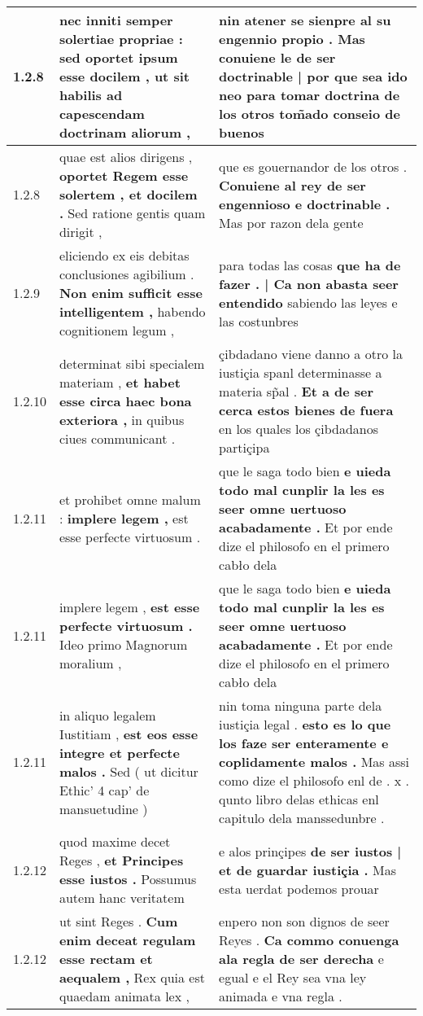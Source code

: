 \begin{tabular}{|p{1cm}|p{6.5cm}|p{6.5cm}|}
1.2.8 & nec inniti semper solertiae propriae : \textbf{ sed oportet ipsum esse docilem , } ut sit habilis ad capescendam doctrinam aliorum , & nin atener se sienpre al su engennio propio . \textbf{ Mas conuiene le de ser doctrinable | por que sea ido neo } para tomar doctrina de los otros tom̃ado conseio de buenos \\\hline
1.2.8 & quae est alios dirigens , \textbf{ oportet Regem esse solertem , et docilem . } Sed ratione gentis quam dirigit , & que es gouernandor de los otros . \textbf{ Conuiene al rey de ser engennioso e doctrinable . } Mas por razon dela gente \\\hline
1.2.9 & eliciendo ex eis debitas conclusiones agibilium . \textbf{ Non enim sufficit esse intelligentem , } habendo cognitionem legum , & para todas las cosas \textbf{ que ha de fazer . | Ca non abasta seer entendido } sabiendo las leyes e las costunbres \\\hline
1.2.10 & determinat sibi specialem materiam , \textbf{ et habet esse circa haec bona exteriora , } in quibus ciues communicant . & çibdadano viene danno a otro la iustiçia spanl determinasse a materia sp̃al . \textbf{ Et a de ser cerca estos bienes de fuera } en los quales los çibdadanos partiçipa \\\hline
1.2.11 & et prohibet omne malum : \textbf{ implere legem , } est esse perfecte virtuosum . & que le saga todo bien \textbf{ e uieda todo mal cunplir la les es seer omne uertuoso acabadamente . } Et por ende dize el philosofo en el primero cabło dela \\\hline
1.2.11 & implere legem , \textbf{ est esse perfecte virtuosum . } Ideo primo Magnorum moralium , & que le saga todo bien \textbf{ e uieda todo mal cunplir la les es seer omne uertuoso acabadamente . } Et por ende dize el philosofo en el primero cabło dela \\\hline
1.2.11 & in aliquo legalem Iustitiam , \textbf{ est eos esse integre et perfecte malos . } Sed ( ut dicitur Ethic’ 4 cap’ de mansuetudine ) & nin toma ninguna parte dela iustiçia legal . \textbf{ esto es lo que los faze ser enteramente e coplidamente malos . } Mas assi como dize el philosofo enl de . x . qunto libro delas ethicas enl capitulo dela manssedunbre . \\\hline
1.2.12 & quod maxime decet Reges , \textbf{ et Principes esse iustos . } Possumus autem hanc veritatem & e alos prinçipes \textbf{ de ser iustos | et de guardar iustiçia . } Mas esta uerdat podemos prouar \\\hline
1.2.12 & ut sint Reges . \textbf{ Cum enim deceat regulam esse rectam et aequalem , } Rex quia est quaedam animata lex , & enpero non son dignos de seer Reyes . \textbf{ Ca commo conuenga ala regla de ser derecha } e egual e el Rey sea vna ley animada e vna regla . \\\hline

\end{tabular}
